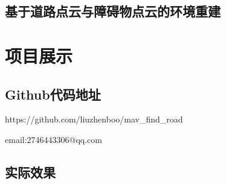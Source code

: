 \documentclass[UTF8]{ctexart}
\begin{document}
\subsection{基于道路点云与障碍物点云的环境重建}


\newpage
\section{项目展示}

\subsection{Github代码地址}

https://github.com/liuzhenboo/mav_find_road

email:2746443306@qq.com

\subsection{实际效果}
\end{document}
